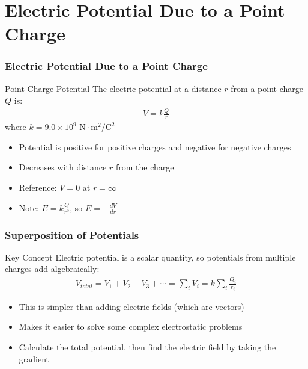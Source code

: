 \documentclass{beamer}
\begin{document}
\section{Electric Potential Due to a Point Charge}

\begin{frame}
    \frametitle{Electric Potential Due to a Point Charge}
    
    \begin{block}{Point Charge Potential}
        The electric potential at a distance $r$ from a point charge $Q$ is:
        \begin{align}
            V = k\frac{Q}{r}
        \end{align}
        where $k = 9.0 \times 10^9 \text{ N}\cdot\text{m}^2/\text{C}^2$
    \end{block}
    
    \begin{itemize}
        \item Potential is positive for positive charges and negative for negative charges
        \item Decreases with distance $r$ from the charge
        \item Reference: $V = 0$ at $r = \infty$
        \item Note: $E = k\frac{Q}{r^2}$, so $E = -\frac{dV}{dr}$
    \end{itemize}
\end{frame}

\begin{frame}
    \frametitle{Superposition of Potentials}
    
    \begin{block}{Key Concept}
        Electric potential is a scalar quantity, so potentials from multiple charges add algebraically:
        \begin{align}
            V_{total} = V_1 + V_2 + V_3 + \cdots = \sum_i V_i = k\sum_i \frac{Q_i}{r_i}
        \end{align}
    \end{block}
    
    \begin{itemize}
        \item This is simpler than adding electric fields (which are vectors)
        \item Makes it easier to solve some complex electrostatic problems
        \item Calculate the total potential, then find the electric field by taking the gradient
    \end{itemize}
\end{frame}
\end{document}
